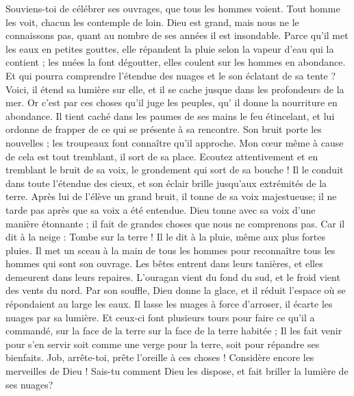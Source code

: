 \begin{multicols}{2}
Souviens-toi de célébrer ses ouvrages, que tous les hommes voient.
Tout homme les voit, chacun les contemple de loin.
Dieu est grand, mais nous ne le connaissons pas, quant au nombre de ses années il est insondable.
Parce qu'il met les eaux  en petites gouttes, elle répandent la pluie selon la vapeur d'eau qui la contient ;
les nuées la font dégoutter, elles coulent sur les hommes en abondance.
Et qui pourra comprendre l'étendue des nuages et le son éclatant de sa tente ?
Voici, il étend sa lumière sur elle, et il se cache jusque dans les profondeurs de la mer.
 Or c'est par ces choses qu'il juge les peuples, qu' il donne la nourriture en abondance.
 Il tient caché dans les paumes de ses mains le feu étincelant, et lui ordonne de frapper de ce qui se présente à sa rencontre.
 Son bruit porte les nouvelles ; les troupeaux font connaître qu'il approche.
\VerseOne{}Mon cœur même à cause de cela est tout tremblant, il sort de sa place.
Ecoutez attentivement et en tremblant le bruit de sa voix, le grondement qui sort de sa bouche !
Il le conduit dans toute l'étendue des cieux, et son éclair brille jusqu'aux extrémités de la terre.
Après lui de l'élève un grand bruit, il tonne de sa voix majestueuse; il ne tarde pas après que sa voix a été entendue.
Dieu tonne avec sa voix d'une manière étonnante ; il fait de grandes choses que nous ne comprenons pas.
Car il dit à la neige : Tombe sur la terre ! Il le dit à la pluie, même aux plus fortes pluies.
Il met un sceau à la main de tous les hommes pour reconnaître tous les hommes qui sont son ouvrage.
Les bêtes entrent dans leurs tanières, et elles demeurent dans leurs repaires.
L'ouragan vient du fond du sud, et le froid vient des vents du nord.
Par son souffle, Dieu donne la glace, et il réduit l'espace où se répondaient au large les eaux.
Il lasse les nuages à force d'arroser, il écarte les nuages par sa lumière.
Et ceux-ci font plusieurs tours pour faire ce qu'il a commandé, sur la face de la terre sur la face de la terre habitée ;
Il les fait venir pour s'en servir soit comme une verge pour la terre, soit pour répandre ses bienfaits.
Job, arrête-toi, prête l'oreille à ces choses ! Considère encore les merveilles de Dieu !
Sais-tu comment Dieu les dispose, et fait briller la lumière de ses nuages?

\end{multicols}
